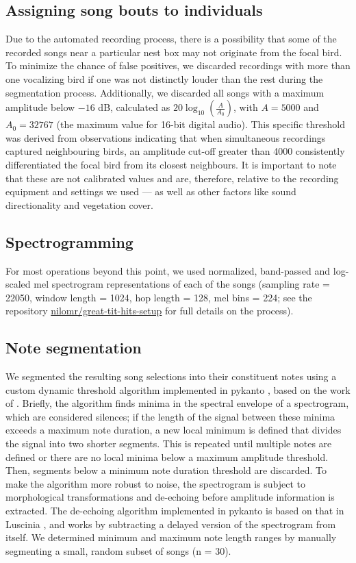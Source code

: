 \subsection{Assigning song bouts to individuals}

Due to the automated recording process, there is a possibility that some of the recorded songs near a particular nest box may not originate from the focal bird. To minimize the chance of false positives, we discarded recordings with more than one vocalizing bird if one was not distinctly louder than the rest during the segmentation process. Additionally, we discarded all songs with a maximum amplitude below $-16$ dB, calculated as $20 \log_{10}\left(\frac{A}{A_0}\right)$, with $A = 5000$ and $A_0 = 32767$ (the maximum value for 16-bit digital audio). This specific threshold was derived from observations indicating that when simultaneous recordings captured neighbouring birds, an amplitude cut-off greater than 4000 consistently differentiated the focal bird from its closest neighbours. It is important to note that these are not calibrated values and are, therefore, relative to the recording equipment and settings we used --- as well as other factors like sound directionality and vegetation cover.

\subsection{Spectrogramming}

For most operations beyond this point, we used normalized, band-passed and log-scaled mel spectrogram representations of each of the songs (sampling rate = 22050,  window length = 1024, hop length = 128, mel bins = 224; see the repository \href{https://github.com/nilomr/great-tit-hits-setup}{nilomr/great-tit-hits-setup} for full details on the process).

\subsection{Note segmentation}

We segmented the resulting song selections into their constituent notes using a custom dynamic threshold algorithm implemented in pykanto \parencite{merinorecalde2023}, based on the work of \textcite{sainburg2019}. Briefly, the algorithm finds minima in the spectral envelope of a spectrogram, which are considered silences; if the length of the signal between these minima exceeds a maximum note duration, a new local minimum is defined that divides the signal into two shorter segments. This is repeated until multiple notes are defined or there are no local minima below a maximum amplitude threshold. Then, segments below a minimum note duration threshold are discarded. To make the algorithm more robust to noise, the spectrogram is subject to morphological transformations and de-echoing before amplitude information is extracted. The de-echoing algorithm implemented in pykanto is based on that in Luscinia \parencite{lachlan2016a}, and works by subtracting a delayed version of the spectrogram from itself. We determined minimum and maximum note length ranges by manually segmenting a small, random subset of songs (n = 30).

